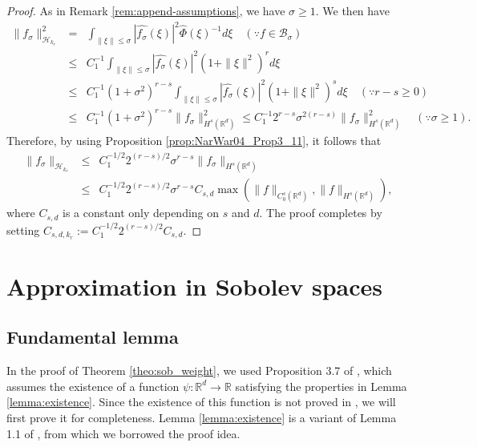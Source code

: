 \documentclass[11pt]{article}
\theoremstyle{remark}
\theoremstyle{example}
\theoremstyle{remark}
\renewcommand{\H}{{\mathcal{H}}}
\newcommand{\R}{\mathbb{R}}
\begin{document}
\begin{proof}
As in Remark \ref{rem:append-assumptions}, we have $\sigma \geq 1$.
We then have
\begin{eqnarray*}
\| f_\sigma \|_{ \H_{k_r}  }^2 &=&  \int_{\| \xi \| \leq \sigma}  | \hat{f_\sigma}(\xi) |^2 \hat{\Phi}(\xi)^{-1} d\xi \quad (\because f \in \mathcal{B}_\sigma) \\ %
&\leq& C_1^{-1} \int_{\| \xi \| \leq \sigma}  | \hat{f_\sigma}(\xi) |^2 (1 + \| \xi \|^2)^r  d\xi \\
&\leq& C_1^{-1} (1 + \sigma^2)^{r-s}  \int_{\| \xi \| \leq \sigma}  | \hat{f_\sigma}(\xi) |^2  (1 + \| \xi \|^2)^s  d\xi \quad (\because r - s \geq 0) \\
&\leq&  C_1^{-1} (1 + \sigma^2)^{r-s} \| f _\sigma\|_{H^s(\R^d)}^2 
\leq C_1^{-1} 2^{r-s} \sigma^{2(r-s)}   \| f_\sigma \|_{H^s(\R^d)}^2 \quad (\because \sigma \geq 1).
\end{eqnarray*}
Therefore, by using Proposition \ref{prop:NarWar04_Prop3_11}, it follows that
\begin{eqnarray*}
\| f_\sigma \|_{ \H_{k_r}  } 
&\leq&  C_1^{-1/2} 2^{(r-s)/2} \sigma^{r-s}   \| f_\sigma \|_{H^s(\R^d)} \\
&\leq& C_1^{-1/2} 2^{(r-s)/2} \sigma^{r-s} C_{s,d}  \max \left( \| f \|_{C_0^s(\R^d)}, \| f \|_{H^s(\R^d)} \right),
\end{eqnarray*}
where $C_{s,d}$ is a constant only depending on $s$ and $d$.
The proof completes by setting $ C_{s,d,k_r} := C_1^{-1/2} 2^{(r-s)/2} C_{s,d}$.
\end{proof}

\section{Approximation in Sobolev spaces} 
\subsection{Fundamental lemma} \label{sec:appendix_lemma}
In the proof of Theorem \ref{theo:sob_weight}, we used Proposition 3.7 of \cite{NarWar04}, which assumes the existence of a function $\psi: \R^d \to \R$ satisfying the properties in Lemma \ref{lemma:existence}.
Since the existence of this function is not proved in \cite{NarWar04}, we will first prove it for completeness. 
Lemma \ref{lemma:existence} is a variant of Lemma 1.1 of \cite{FraJawWei91}, from which we borrowed the proof idea.
\end{document}
